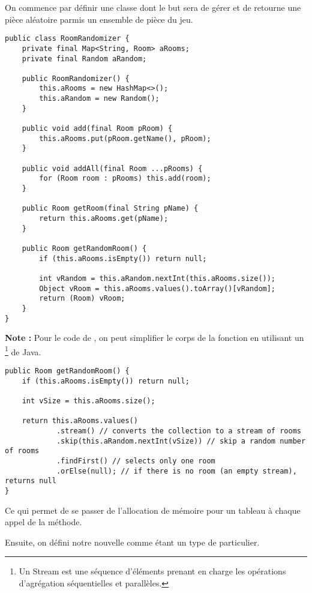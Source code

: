 \begin{exercise}[subtitle=Transporter]

On commence par définir une classe  dont le but sera de gérer et de retourne une pièce aléatoire parmis un ensemble de pièce du jeu.

\begin{verbatim}
public class RoomRandomizer {
    private final Map<String, Room> aRooms;
    private final Random aRandom;

    public RoomRandomizer() {
        this.aRooms = new HashMap<>();
        this.aRandom = new Random();
    }

    public void add(final Room pRoom) {
        this.aRooms.put(pRoom.getName(), pRoom);
    }

    public void addAll(final Room ...pRooms) {
        for (Room room : pRooms) this.add(room);
    }

    public Room getRoom(final String pName) {
        return this.aRooms.get(pName);
    }

    public Room getRandomRoom() {
        if (this.aRooms.isEmpty()) return null;

        int vRandom = this.aRandom.nextInt(this.aRooms.size());
        Object vRoom = this.aRooms.values().toArray()[vRandom];
        return (Room) vRoom;
    }
}
\end{verbatim}

\textbf{Note :} Pour le code de , on peut simplifier le corps de la fonction en utilisant un \footnote{Un Stream est une séquence d'éléments prenant en charge les opérations d'agrégation séquentielles et parallèles.} de Java.

\begin{verbatim}
public Room getRandomRoom() {
    if (this.aRooms.isEmpty()) return null;

    int vSize = this.aRooms.size();

    return this.aRooms.values()
            .stream() // converts the collection to a stream of rooms
            .skip(this.aRandom.nextInt(vSize)) // skip a random number of rooms
            .findFirst() // selects only one room
            .orElse(null); // if there is no room (an empty stream), returns null
}
\end{verbatim}

Ce qui permet de se passer de l'allocation de mémoire pour un tableau à chaque appel de la méthode.

Ensuite, on défini notre nouvelle  comme étant un type de  particulier.


\end{exercise}
